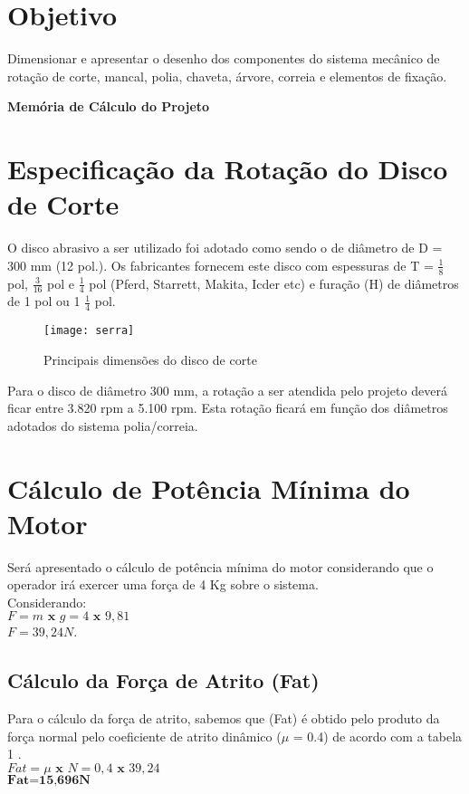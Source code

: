 \documentclass[a4paper, 11pt]{article}
\begin{document}
\section{Objetivo}
Dimensionar e apresentar o desenho dos componentes do sistema
mec\^anico de rota\c{c}\~ao de corte, mancal, polia, chaveta, \'arvore, correia e elementos
de fixa\c{c}\~ao.\\
\begin{center}
\textbf{Mem\'oria de C\'alculo do Projeto}
\end{center}
\section{Especifica\c{c}\~ao da Rota\c{c}\~ao do Disco de Corte}
O disco abrasivo a ser utilizado foi adotado como sendo o de di\^ametro de
D = 300 mm (12 pol.). Os fabricantes fornecem este disco com espessuras de T
= $\frac{1}{8}$ pol, $\frac{3}{16}$ pol e $\frac{1}{4} $ pol (Pferd, Starrett, Makita, Icder etc) e fura\c{c}\~ao (H) de di\^ametros
de 1 pol ou 1 $\frac{1}{4}$ pol.\\
\begin{figure}[!htb]
    \centering
    \texttt{[image: serra]}
    \caption{Principais dimens\~oes do disco de corte}
    \label{figRotulo}
  \end{figure}
Para o disco de di\^ametro 300 mm, a rota\c{c}\~ao a ser atendida pelo projeto
dever\'a ficar entre 3.820 rpm a 5.100 rpm. Esta rota\c{c}\~ao ficar\'a em fun\c{c}\~ao dos
di\^ametros adotados do sistema polia/correia.\\
\section{C\'alculo de Pot\^encia M\'inima do Motor}
Ser\'a apresentado o c\'alculo de pot\^encia m\'inima do motor considerando que
o operador ir\'a exercer uma força de 4 Kg sobre o sistema.\\
Considerando:\\
$F = m \textbf{ x } g = 4 \textbf{ x } 9,81$\\
$F = 39,24 N$.\\
\subsection{C\'alculo da For\c{c}a de Atrito (Fat)}
Para o c\'alculo da for\c{c}a de atrito, sabemos que (Fat) \'e obtido pelo produto
da for\c{c}a normal pelo coeficiente de atrito din\^amico ($\mu$ = 0.4) de acordo com a tabela
1 .\\
$Fat = \mu \textbf{ x } N = 0,4 \textbf{ x } 39,24$\\
$\textbf{Fat=15,696N}$\\
\end{document}

